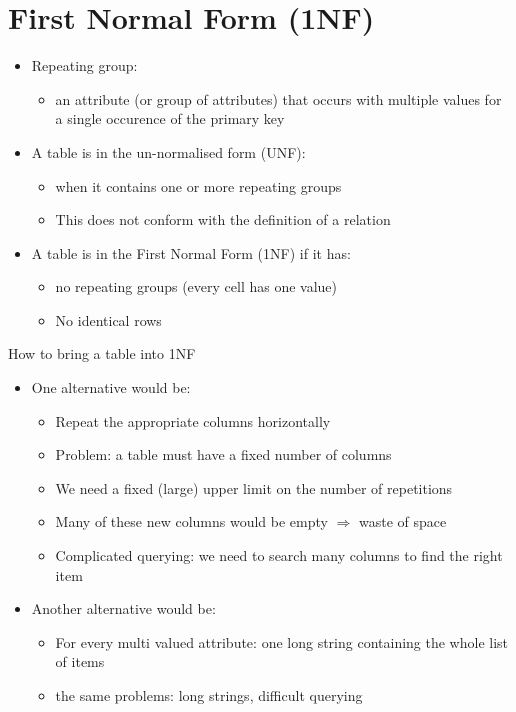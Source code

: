 \documentclass{article}[18pt]
\begin{document}
\section{First Normal Form (1NF)}
\begin{itemize}
	\item Repeating group:
	\begin{itemize}
		\item an attribute (or group of attributes) that occurs with multiple values for a single occurence of the primary key
	\end{itemize}
	\item A table is in the un-normalised form (UNF):
	\begin{itemize}
		\item when it contains one or more repeating groups
		\item This does not conform with the definition of a relation
	\end{itemize}
	\item A table is in the First Normal Form (1NF) if it has:
	\begin{itemize}
		\item no repeating groups (every cell has one value)
		\item No identical rows
	\end{itemize}
\end{itemize}
How to bring a table into 1NF
\begin{itemize}
	\item One alternative would be:
	\begin{itemize}
		\item Repeat the appropriate columns horizontally
		\item Problem: a table must have a fixed number of columns
		\item We need a fixed (large) upper limit on the number of repetitions
		\item Many of these new columns would be empty $\Rightarrow$ waste of space
		\item Complicated querying: we need to search many columns to find the right item
	\end{itemize}
	\item Another alternative would be:
	\begin{itemize}
		\item For every multi valued attribute: one long string containing the whole list of items
		\item the same problems: long strings, difficult querying
	\end{itemize}
\end{itemize}
\end{document}
